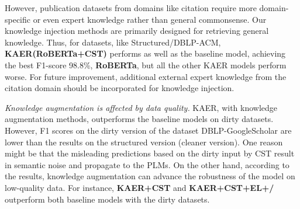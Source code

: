 However, publication datasets from domains like citation require more domain-specific or even expert knowledge rather than general commonsense. Our knowledge injection methods are primarily designed for retrieving general knowledge. Thus, for datasets, like Structured/DBLP-ACM, \textbf{KAER(RoBERTa+CST)} performs as well as the baseline model, achieving the best F1-score 98.8\%, \textbf{RoBERTa}, but all the other KAER models perform worse. For future improvement, additional external expert knowledge from the citation domain should be incorporated for knowledge injection. 

\textit{Knowledge augmentation is affected by data quality.}
KAER, with knowledge augmentation methods, outperforms the baseline models on dirty datasets. However, F1 scores on the dirty version of the dataset DBLP-GoogleScholar are lower than the results on the structured version (cleaner version). One reason might be that the misleading predictions based on the dirty input by CST result in semantic noise and propagate to the PLMs.
On the other hand, according to the results, knowledge augmentation can advance the robustness of the model on low-quality data. For instance, \textbf{KAER+CST} and \textbf{KAER+CST+EL+/} outperform both baseline models with the dirty datasets.


 



